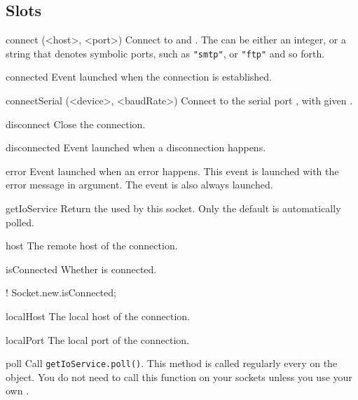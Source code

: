 \subsection{Slots}
\begin{urbiscriptapi}
\item[connect](<host>, <port>)%
  Connect \this to  and .  The
   can be either an integer, or a string that denotes
  symbolic ports, such as \lstinline|"smtp"|, or \lstinline|"ftp"| and
  so forth.


\item[connected]%
  Event launched when the connection is established.


\item[connectSerial](<device>, <baudRate>)%
  Connect \this to the serial port , with given
  .


\item[disconnect]%
  Close the connection.


\item[disconnected]
  Event launched when a disconnection happens.


\item[error]
  Event launched when an error happens. This event is launched with
  the error message in argument. The event  is
  also always launched.


\item[getIoService] Return the  used by this
  socket. Only the default  is automatically polled.


\item[host]
  The remote host of the connection.


\item[isConnected]
  Whether \this is connected.
\begin{urbiassert}
! Socket.new.isConnected;
\end{urbiassert}


\item[localHost]
  The local host of the connection.


\item[localPort]
  The local port of the connection.


\item[poll] Call \lstinline|getIoService.poll()|. This method is called
  regularly every  on the 
  object. You do not need to call this function on your sockets unless you
  use your own .



\end{urbiscriptapi}
